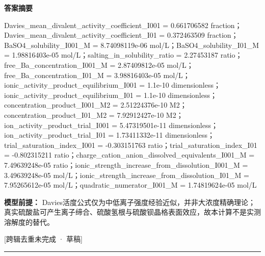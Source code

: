 \documentclass[UTF8,11pt,a4paper]{ctexart}
\begin{document}
\noindent\textbf{答案摘要}\par
Davies\_mean\_divalent\_activity\_coefficient\_I001 = 0.661706582 fraction；Davies\_mean\_divalent\_activity\_coefficient\_I01 = 0.372463509 fraction；BaSO4\_solubility\_I001\_M = 8.74098119e-06 mol/L；BaSO4\_solubility\_I01\_M = 1.98816403e-05 mol/L；salting\_in\_solubility\_ratio = 2.27453187 ratio；free\_Ba\_concentration\_I001\_M = 2.87409812e-05 mol/L；free\_Ba\_concentration\_I01\_M = 3.98816403e-05 mol/L；ionic\_activity\_product\_equilibrium\_I001 = 1.1e-10 dimensionless；ionic\_activity\_product\_equilibrium\_I01 = 1.1e-10 dimensionless；concentration\_product\_I001\_M2 = 2.51224376e-10 M2；concentration\_product\_I01\_M2 = 7.92912427e-10 M2；ion\_activity\_product\_trial\_I001 = 5.47319501e-11 dimensionless；ion\_activity\_product\_trial\_I01 = 1.73411332e-11 dimensionless；trial\_saturation\_index\_I001 = -0.303151763 ratio；trial\_saturation\_index\_I01 = -0.802315211 ratio；charge\_cation\_anion\_dissolved\_equivalents\_I001\_M = 7.49639248e-05 ratio；ionic\_strength\_increase\_from\_dissolution\_I001\_M = 3.49639248e-05 mol/L；ionic\_strength\_increase\_from\_dissolution\_I01\_M = 7.95265612e-05 mol/L；quadratic\_numerator\_I001\_M = 1.74819624e-05 mol/L\par
\noindent\textbf{模型前提：}
Davies活度公式仅为中低离子强度经验近似，并非大浓度精确理论；真实硫酸盐可产生离子缔合、硫酸氢根与硫酸钡晶格表面效应，故本计算不是实测溶解度的替代。\par
\noindent\textcolor{red!65!black}{[跨辑去重未完成 · 草稿]} \par
\medskip\hrule\medskip
{}
\end{document}
